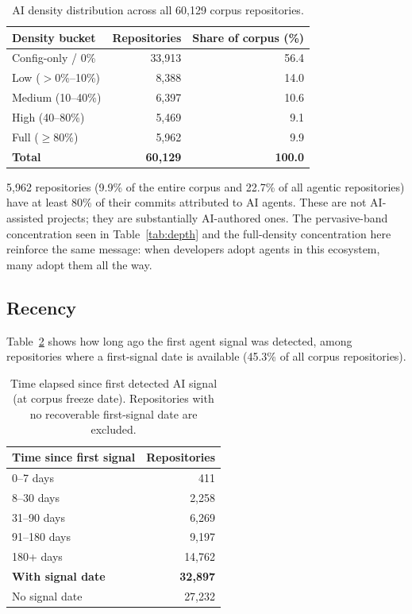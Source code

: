 \begin{table}[h]
\centering
\caption{AI density distribution across all 60,129 corpus repositories.}
\label{tab:density}
\begin{tabular}{@{}lrr@{}}
\toprule
Density bucket & Repositories & Share of corpus (\%) \\
\midrule
Config-only / 0\%          & 33,913 & 56.4 \\
Low ($>$0\%--10\%)         &  8,388 & 14.0 \\
Medium (10--40\%)          &  6,397 & 10.6 \\
High (40--80\%)            &  5,469 &  9.1 \\
Full ($\geq$80\%)          &  5,962 &  9.9 \\
\midrule
\textbf{Total} & \textbf{60,129} & \textbf{100.0} \\
\bottomrule
\end{tabular}
\end{table}

5,962 repositories (9.9\% of the entire corpus and 22.7\% of all agentic repositories) have at least 80\% of their commits attributed to AI agents. These are not AI-assisted projects; they are substantially AI-authored ones. The pervasive-band concentration seen in Table~\ref{tab:depth} and the full-density concentration here reinforce the same message: when developers adopt agents in this ecosystem, many adopt them all the way.

\subsection{Recency}

Table~\ref{tab:recency} shows how long ago the first agent signal was detected, among repositories where a first-signal date is available (45.3\% of all corpus repositories).

\begin{table}[h]
\centering
\caption{Time elapsed since first detected AI signal (at corpus freeze date).
         Repositories with no recoverable first-signal date are excluded.}
\label{tab:recency}
\begin{tabular}{@{}lr@{}}
\toprule
Time since first signal & Repositories \\
\midrule
0--7 days    &    411 \\
8--30 days   &  2,258 \\
31--90 days  &  6,269 \\
91--180 days &  9,197 \\
180+ days    & 14,762 \\
\midrule
\textbf{With signal date} & \textbf{32,897} \\
No signal date            & 27,232 \\
\bottomrule
\end{tabular}
\end{table}

